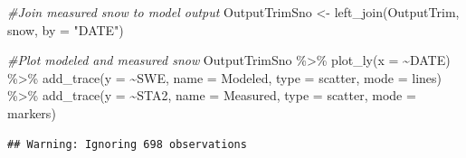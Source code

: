 \documentclass[
]{book}
\newenvironment{Shaded}{\begin{snugshade}}{\end{snugshade}}
\newcommand{\AttributeTok}[1]{\textcolor[rgb]{0.77,0.63,0.00}{#1}}
\newcommand{\CommentTok}[1]{\textcolor[rgb]{0.56,0.35,0.01}{\textit{#1}}}
\newcommand{\DecValTok}[1]{\textcolor[rgb]{0.00,0.00,0.81}{#1}}
\newcommand{\FunctionTok}[1]{\textcolor[rgb]{0.00,0.00,0.00}{#1}}
\newcommand{\NormalTok}[1]{#1}
\newcommand{\OtherTok}[1]{\textcolor[rgb]{0.56,0.35,0.01}{#1}}
\newcommand{\SpecialCharTok}[1]{\textcolor[rgb]{0.00,0.00,0.00}{#1}}
\newcommand{\StringTok}[1]{\textcolor[rgb]{0.31,0.60,0.02}{#1}}
\begin{document}
\begin{Shaded}
\begin{Highlighting}[]
\CommentTok{\#Join measured snow to model output}
\NormalTok{OutputTrimSno }\OtherTok{\textless{}{-}} \FunctionTok{left\_join}\NormalTok{(OutputTrim, snow, }\AttributeTok{by =} \StringTok{"DATE"}\NormalTok{)}

\CommentTok{\#Plot modeled and measured snow}
\NormalTok{OutputTrimSno }\SpecialCharTok{\%\textgreater{}\%} \FunctionTok{plot\_ly}\NormalTok{(}\AttributeTok{x =} \SpecialCharTok{\textasciitilde{}}\NormalTok{DATE) }\SpecialCharTok{\%\textgreater{}\%} 
        \FunctionTok{add\_trace}\NormalTok{(}\AttributeTok{y =} \SpecialCharTok{\textasciitilde{}}\NormalTok{SWE, }\AttributeTok{name =} \StringTok{\textquotesingle{}Modeled\textquotesingle{}}\NormalTok{, }\AttributeTok{type =} \StringTok{\textquotesingle{}scatter\textquotesingle{}}\NormalTok{, }\AttributeTok{mode =} \StringTok{\textquotesingle{}lines\textquotesingle{}}\NormalTok{) }\SpecialCharTok{\%\textgreater{}\%} 
        \FunctionTok{add\_trace}\NormalTok{(}\AttributeTok{y =} \SpecialCharTok{\textasciitilde{}}\NormalTok{STA2, }\AttributeTok{name =} \StringTok{\textquotesingle{}Measured\textquotesingle{}}\NormalTok{, }\AttributeTok{type =} \StringTok{\textquotesingle{}scatter\textquotesingle{}}\NormalTok{, }\AttributeTok{mode =} \StringTok{\textquotesingle{}markers\textquotesingle{}}\NormalTok{)}
\end{Highlighting}
\end{Shaded}

\begin{verbatim}
## Warning: Ignoring 698 observations
\end{verbatim}

\begin{Shaded}
\end{Shaded}
\end{document}
